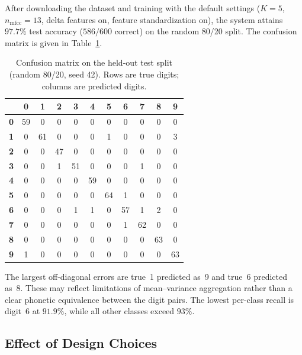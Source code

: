\documentclass[12pt,a4paper]{article}
\begin{document}
After downloading the dataset and training with the default settings
($K = 5$, $n_\text{mfcc} = 13$, delta features on, feature standardization
on), the system attains \textbf{$97.7\%$} test accuracy ($586/600$ correct)
on the random 80/20 split. The confusion matrix is given in
Table~\ref{tab:confusion}.

\begin{table}[H]
\centering
\caption{Confusion matrix on the held-out test split (random 80/20, seed 42). Rows are true digits; columns are predicted digits.}
\label{tab:confusion}
\small
\begin{tabular}{c|cccccccccc}
\toprule
 & \textbf{0} & \textbf{1} & \textbf{2} & \textbf{3} & \textbf{4} & \textbf{5} & \textbf{6} & \textbf{7} & \textbf{8} & \textbf{9} \\
\midrule
\textbf{0} & 59 & 0  & 0  & 0  & 0  & 0  & 0  & 0  & 0  & 0  \\
\textbf{1} & 0  & 61 & 0  & 0  & 0  & 1  & 0  & 0  & 0  & 3  \\
\textbf{2} & 0  & 0  & 47 & 0  & 0  & 0  & 0  & 0  & 0  & 0  \\
\textbf{3} & 0  & 0  & 1  & 51 & 0  & 0  & 0  & 1  & 0  & 0  \\
\textbf{4} & 0  & 0  & 0  & 0  & 59 & 0  & 0  & 0  & 0  & 0  \\
\textbf{5} & 0  & 0  & 0  & 0  & 0  & 64 & 1  & 0  & 0  & 0  \\
\textbf{6} & 0  & 0  & 0  & 1  & 1  & 0  & 57 & 1  & 2  & 0  \\
\textbf{7} & 0  & 0  & 0  & 0  & 0  & 0  & 1  & 62 & 0  & 0  \\
\textbf{8} & 0  & 0  & 0  & 0  & 0  & 0  & 0  & 0  & 63 & 0  \\
\textbf{9} & 1  & 0  & 0  & 0  & 0  & 0  & 0  & 0  & 0  & 63 \\
\bottomrule
\end{tabular}
\end{table}

The largest off-diagonal errors are true~1 predicted as~9 and true~6
predicted as~8. These may reflect limitations of mean--variance aggregation
rather than a clear phonetic equivalence between the digit pairs. The lowest
per-class recall is digit~6 at $91.9\%$, while all other classes exceed
$93\%$.

\subsection{Effect of Design Choices}
\end{document}
